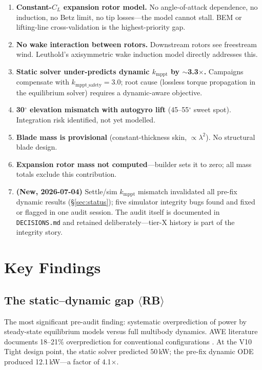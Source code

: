 \documentclass[11pt,a4paper]{article}
\newcommand{\RB}{$\langle$RB$\rangle$}  %
\begin{document}
\begin{enumerate}
\item \textbf{Constant-$C_L$ expansion rotor model.} No angle-of-attack dependence,
      no induction, no Betz limit, no tip losses---the model cannot stall.
      BEM or lifting-line cross-validation is the highest-priority gap.
\item \textbf{No wake interaction between rotors.} Downstream rotors see freestream wind.
      Leuthold's axisymmetric wake induction model \cite{leuthold2019} directly addresses this.
\item \textbf{Static solver under-predicts dynamic $k_{\text{mppt}}$ by $\sim$3.3$\times$.}
      Campaigns compensate with $k_{\text{mppt\_safety}} = 3.0$; root cause (lossless torque
      propagation in the equilibrium solver) requires a dynamic-aware objective.
\item \textbf{30$^\circ$ elevation mismatch with autogyro lift} (45--55$^\circ$ sweet spot).
      Integration risk identified, not yet modelled.
\item \textbf{Blade mass is provisional} (constant-thickness skin, $\propto \lambda^2$).
      No structural blade design.
\item \textbf{Expansion rotor mass not computed}---builder sets it to zero;
      all mass totals exclude this contribution.
\item \textbf{(New, 2026-07-04)} Settle/sim $k_{\text{mppt}}$ mismatch invalidated all
      pre-fix dynamic results (\S\ref{sec:status}); five simulator integrity bugs found
      and fixed or flagged in one audit session. The audit itself is documented in
      \texttt{DECISIONS.md} and retained deliberately---tier-X history is part of the integrity story.
\end{enumerate}

\section{Key Findings}

\subsection{The static--dynamic gap \RB}

The most significant pre-audit finding: systematic overprediction of power by steady-state
equilibrium models versus full multibody dynamics.
AWE literature documents 18--21\% overprediction for conventional configurations
\cite{kheiri2018,leuthold2019,carceller2022}.
At the V10 Tight design point, the static solver predicted 50\,kW;
the pre-fix dynamic ODE produced 12.1\,kW---a factor of 4.1$\times$.
\end{document}
